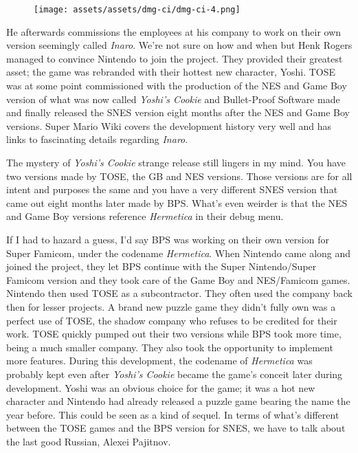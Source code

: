 \documentclass{book}
\let\oldcenter\center
\let\oldendcenter\endcenter
\renewenvironment{center}{\setlength\topsep{0pt}\oldcenter}{\oldendcenter}
\begin{document}
\begin{figure}[hbt]
\vskip 10pt
\centering \texttt{[image: assets/assets/dmg-ci/dmg-ci-4.png]}
\vskip 6pt
\end{figure}

He afterwards commissions the employees at his company to work on their own version seemingly called \emph{Inaro}. We’re not sure on how and when but Henk Rogers managed to convince Nintendo to join the project. They provided their greatest asset; the game was rebranded with their hottest new character, Yoshi. TOSE was at some point commissioned with the production of the NES and Game Boy version of what was now called \emph{Yoshi’s Cookie} and Bullet-Proof Software made and finally released the SNES version eight months after the NES and Game Boy versions. Super Mario Wiki covers the development history very well and has links to fascinating details regarding \emph{Inaro}.

\begin{center}
\quad\vspace{4pt}
\quad\vspace{4pt}
\quad\vspace{4pt}
\end{center}

The mystery of \emph{Yoshi’s Cookie} strange release still lingers in my mind. You have two versions made by TOSE, the GB and NES versions. Those versions are for all intent and purposes the same and you have a very different SNES version that came out eight months later made by BPS. What’s even weirder is that the NES and Game Boy versions reference \emph{Hermetica} in their debug menu.

If I had to hazard a guess, I’d say BPS was working on their own version for Super Famicom, under the codename \emph{Hermetica}. When Nintendo came along and joined the project, they let BPS continue with the Super Nintendo/Super Famicom version and they took care of the Game Boy and NES/Famicom games. Nintendo then used TOSE as a subcontractor. They often used the company back then for lesser projects. A brand new puzzle game they didn’t fully own was a perfect use of TOSE, the shadow company who refuses to be credited for their work. TOSE quickly pumped out their two versions while BPS took more time, being a much smaller company. They also took the opportunity to implement more features. During this development, the codename of \emph{Hermetica} was probably kept even after \emph{Yoshi’s Cookie} became the game’s conceit later during development. Yoshi was an obvious choice for the game; it was a hot new character and Nintendo had already released a puzzle game bearing the name the year before. This could be seen as a kind of sequel. In terms of what’s different between the TOSE games and the BPS version for SNES, we have to talk about the last good Russian, Alexei Pajitnov.
\end{document}
